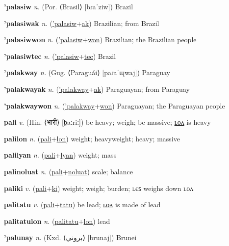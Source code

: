 \textbf{\hypertarget{'palasiw}{'palasiw}} \textit{n.} (Por. ⟨Brasil⟩ [bɾaˈziw])
Brazil

\textbf{\hypertarget{'palasiwak}{'palasiwak}} \textit{n.} (\hyperlink{'palasiw}{'palasiw}+\allowbreak \hyperlink{ak}{ak})
Brazilian; from Brazil

\textbf{\hypertarget{'palasiwwon}{'palasiwwon}} \textit{n.} (\hyperlink{'palasiw}{'palasiw}+\allowbreak \hyperlink{won}{won})
Brazilian; the Brazilian people

\textbf{\hypertarget{'palasiwtec}{'palasiwtec}} \textit{n.} (\hyperlink{'palasiw}{'palasiw}+\allowbreak \hyperlink{tec}{tec})
Brazil

\textbf{\hypertarget{'palakway}{'palakway}} \textit{n.} (Gug. ⟨Paraguái⟩ [paɾaˈɰwaj])
Paraguay

\textbf{\hypertarget{'palakwayak}{'palakwayak}} \textit{n.} (\hyperlink{'palakway}{'palakway}+\allowbreak \hyperlink{ak}{ak})
Paraguayan; from Paraguay

\textbf{\hypertarget{'palakwaywon}{'palakwaywon}} \textit{n.} (\hyperlink{'palakway}{'palakway}+\allowbreak \hyperlink{won}{won})
Paraguayan; the Paraguayan people

\textbf{\hypertarget{pali}{pali}} \textit{v.} (Hin. ⟨{\devanagari{}भारी}⟩ [b̤aːriː])
be heavy; weigh; be massive; \hyperlink{palilon}{ʟᴏᴧ} is heavy

\textbf{\hypertarget{palilon}{palilon}} \textit{n.} (\hyperlink{pali}{pali}+\allowbreak \hyperlink{lon}{lon})
weight; heavyweight; heavy; massive

\textbf{\hypertarget{palilyan}{palilyan}} \textit{n.} (\hyperlink{pali}{pali}+\allowbreak \hyperlink{lyan}{lyan})
weight; mass

\textbf{\hypertarget{palinoluat}{palinoluat}} \textit{n.} (\hyperlink{pali}{pali}+\allowbreak \hyperlink{noluat}{noluat})
scale; balance

\textbf{\hypertarget{paliki}{paliki}} \textit{v.} (\hyperlink{pali}{pali}+\allowbreak \hyperlink{ki}{ki})
weight; weigh; burden; ʟєꜱ weighs down ʟᴏᴧ

\textbf{\hypertarget{palitatu}{palitatu}} \textit{v.} (\hyperlink{pali}{pali}+\allowbreak \hyperlink{tatu}{tatu})
be lead; \hyperlink{palitatulon}{ʟᴏᴧ} is made of lead

\textbf{\hypertarget{palitatulon}{palitatulon}} \textit{n.} (\hyperlink{palitatu}{palitatu}+\allowbreak \hyperlink{lon}{lon})
lead

\textbf{\hypertarget{'palunay}{'palunay}} \textit{n.} (Kxd. ⟨{\arabics{}بروني}⟩ [brunaj])
Brunei

